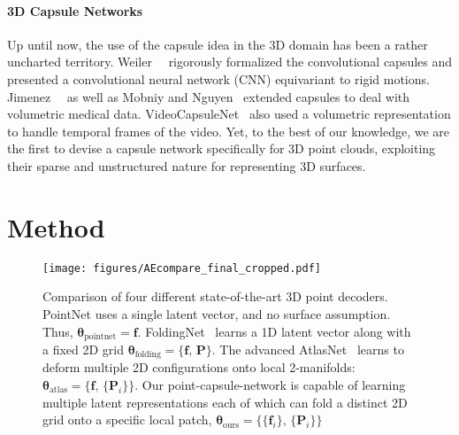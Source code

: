 \documentclass[10pt,twocolumn,letterpaper]{article}
\theoremstyle{break}
\newcommand{\Pm}{\mathbf{P}}
\newcommand{\f}{\mathbf{f}}
\begin{document}
\vspace{-1.5mm}\paragraph{3D Capsule Networks} Up until now, the use of the capsule idea in the 3D domain has been a rather uncharted territory. Weiler~\etal~\cite{weiler20183d} rigorously formalized the convolutional capsules and presented a convolutional neural network (CNN) equivariant to rigid motions. Jimenez~\etal~\cite{jimenez2018capsule} as well as Mobniy and Nguyen~\cite{mobiny2018fast} extended capsules to deal with volumetric medical data. VideoCapsuleNet~\cite{duarte2018videocapsulenet} also used a volumetric representation to handle temporal frames of the video. Yet, to the best of our knowledge, we are the first to devise a capsule network specifically for 3D point clouds, exploiting their sparse and unstructured nature for representing 3D surfaces. \section{Method}
\label{sec:method}
\begin{figure*}[!th]
   \centering
    \texttt{[image: figures/AEcompare\_final\_cropped.pdf]}
    \caption{Comparison of four different state-of-the-art 3D point decoders. PointNet uses a single latent vector, and no surface assumption. Thus, $\bm{\theta}_{\text{pointnet}}=\f$. FoldingNet~\cite{Yang_2018_CVPR} learns a 1D latent vector along with a fixed 2D grid $\bm{\theta}_{\text{folding}}=\{ \f,\,\Pm\}$. The advanced AtlasNet~\cite{groueix2018} learns to deform multiple 2D configurations onto local 2-manifolds: $\bm{\theta}_{\text{atlas}}=\{ \f,\,\{\Pm_i\}\}$. Our point-capsule-network is capable of learning multiple latent representations each of which can fold a distinct 2D grid onto a specific local patch, $\bm{\theta}_{\text{ours}}=\{ \{\f_i\},\,\{\Pm_i\}\}$}
    \label{fig:aecompare}
\end{figure*}
\end{document}
